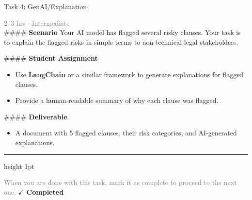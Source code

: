 \documentclass[10pt,a4paper]{article}
\begin{document}
\begin{taskbox}{Task 4: GenAI/Explanation}

    {\small \textcolor{gray}{2--3 hrs $\cdot$ Intermediate}}\\[12pt]

    \#\#\#\# \textbf{Scenario}  
Your AI model has flagged several risky clauses. Your task is to explain the flagged risks in simple terms to non-technical legal stakeholders.  

\#\#\#\# \textbf{Student Assignment}  
\begin{itemize}
    \item Use \textbf{LangChain} or a similar framework to generate explanations for flagged clauses.  
    \item Provide a human-readable summary of why each clause was flagged.  
\end{itemize}

\#\#\#\# \textbf{Deliverable}  
\begin{itemize}
    \item A document with 5 flagged clauses, their risk categories, and AI-generated explanations.\par
\end{itemize}

    \vspace{16pt}

    \textcolor{cardBorder}{\hrule height 1pt}\vspace{8pt}

    \small \textcolor{gray}{When you are done with this task, mark it as complete to proceed to the next one.} \hfill \textbf{\textcolor{brandDark}{$\checkmark$ Completed}}

\end{taskbox}
\end{document}
